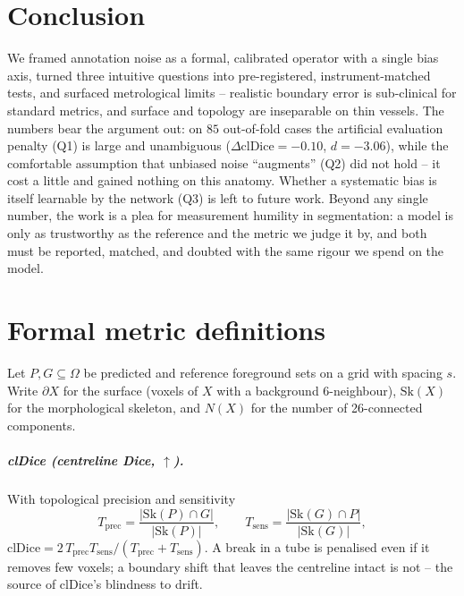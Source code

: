 \documentclass[
    bookmarks, bookmarksnumbered, bookmarksopen,
    colorlinks=true, citecolor=blue, linkcolor=blue, urlcolor=blue
]{techrep}
\begin{document}
\chapter{Conclusion}
We framed annotation noise as a formal, calibrated operator with a single bias axis,
turned three intuitive questions into pre-registered, instrument-matched tests, and
surfaced metrological limits -- realistic boundary error is sub-clinical for standard
metrics, and surface and topology are inseparable on thin vessels. The numbers bear the
argument out: on $85$ out-of-fold cases the artificial evaluation penalty (Q1) is large and
unambiguous ($\Delta\text{clDice}{=}{-}0.10$, $d{=}{-}3.06$), while the comfortable assumption
that unbiased noise ``augments'' (Q2) did not hold -- it cost a little and gained nothing on
this anatomy. Whether a systematic bias is itself learnable by the network (Q3) is left to
future work. Beyond any single number, the work is a plea for measurement
humility in segmentation: a model is only as trustworthy as the reference and the metric we
judge it by, and both must be reported, matched, and doubted with the same rigour we spend on
the model.

\clearpage
\appendix
\chapter{Formal metric definitions}\label{app:defs}
Let $P,G\subseteq\Omega$ be predicted and reference foreground sets on a grid with spacing
$s$. Write $\partial X$ for the surface (voxels of $X$ with a background 6-neighbour),
$\mathrm{Sk}(X)$ for the morphological skeleton, and $N(X)$ for the number of
26-connected components.

\paragraph{clDice (centreline Dice, $\uparrow$).} With topological precision and
sensitivity
\[
  T_{\text{prec}}=\frac{|\mathrm{Sk}(P)\cap G|}{|\mathrm{Sk}(P)|},\qquad
  T_{\text{sens}}=\frac{|\mathrm{Sk}(G)\cap P|}{|\mathrm{Sk}(G)|},
\]
$\text{clDice}=2\,T_{\text{prec}}T_{\text{sens}}/(T_{\text{prec}}+T_{\text{sens}})$.
A break in a tube is penalised even if it removes few voxels; a boundary shift that leaves
the centreline intact is not -- the source of clDice's blindness to drift.
\end{document}
